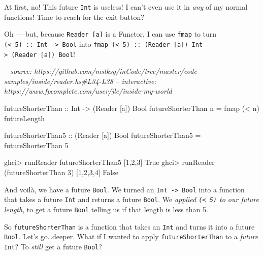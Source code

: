 \documentclass[]{article}
\newenvironment{Shaded}{}{}
\newcommand{\CommentTok}[1]{\textcolor[rgb]{0.38,0.63,0.69}{\textit{#1}}}
\newcommand{\DataTypeTok}[1]{\textcolor[rgb]{0.56,0.13,0.00}{#1}}
\newcommand{\DecValTok}[1]{\textcolor[rgb]{0.25,0.63,0.44}{#1}}
\newcommand{\FunctionTok}[1]{\textcolor[rgb]{0.02,0.16,0.49}{#1}}
\newcommand{\NormalTok}[1]{#1}
\newcommand{\OtherTok}[1]{\textcolor[rgb]{0.00,0.44,0.13}{#1}}
\begin{document}
At first, no! This future \texttt{Int} is useless! I can't even use it in
\emph{any} of my normal functions! Time to reach for the exit button?

Oh --- but, because \texttt{Reader\ {[}a{]}} is a Functor, I can use
\texttt{fmap} to turn \texttt{(\textless{}\ 5)\ ::\ Int\ -\textgreater{}\ Bool}
into
\texttt{fmap\ (\textless{}\ 5)\ ::\ (Reader\ {[}a{]})\ Int\ -\textgreater{}\ (Reader\ {[}a{]})\ Bool}!

\begin{Shaded}
\begin{Highlighting}[]
\CommentTok{-- source: https://github.com/mstksg/inCode/tree/master/code-samples/inside/reader.hs#L34-L38}
\CommentTok{-- interactive: https://www.fpcomplete.com/user/jle/inside-my-world}

\OtherTok{futureShorterThan ::} \DataTypeTok{Int} \OtherTok{->}\NormalTok{ (}\DataTypeTok{Reader}\NormalTok{ [a]) }\DataTypeTok{Bool}
\NormalTok{futureShorterThan n }\FunctionTok{=}\NormalTok{ fmap (}\FunctionTok{<}\NormalTok{ n) futureLength}

\OtherTok{futureShorterThan5 ::}\NormalTok{ (}\DataTypeTok{Reader}\NormalTok{ [a]) }\DataTypeTok{Bool}
\NormalTok{futureShorterThan5 }\FunctionTok{=}\NormalTok{ futureShorterThan }\DecValTok{5}
\end{Highlighting}
\end{Shaded}

\begin{Shaded}
\begin{Highlighting}[]
\NormalTok{ghci}\FunctionTok{>}\NormalTok{ runReader futureShorterThan5 [}\DecValTok{1}\NormalTok{,}\DecValTok{2}\NormalTok{,}\DecValTok{3}\NormalTok{]}
\DataTypeTok{True}
\NormalTok{ghci}\FunctionTok{>}\NormalTok{ runReader (futureShorterThan }\DecValTok{3}\NormalTok{) [}\DecValTok{1}\NormalTok{,}\DecValTok{2}\NormalTok{,}\DecValTok{3}\NormalTok{,}\DecValTok{4}\NormalTok{]}
\DataTypeTok{False}
\end{Highlighting}
\end{Shaded}

And voilà, we have a future \texttt{Bool}. We turned an
\texttt{Int\ -\textgreater{}\ Bool} into a function that takes a future
\texttt{Int} and returns a future \texttt{Bool}. We \emph{applied
\texttt{(\textless{}\ 5)} to our future length}, to get a future \texttt{Bool}
telling us if that length is less than 5.

So \texttt{futureShorterThan} is a function that takes an \texttt{Int} and turns
it into a future \texttt{Bool}. Let's go\ldots{}deeper. What if I wanted to
apply \texttt{futureShorterThan} to a \emph{future} \texttt{Int}? To
\emph{still} get a future \texttt{Bool}?
\end{document}
